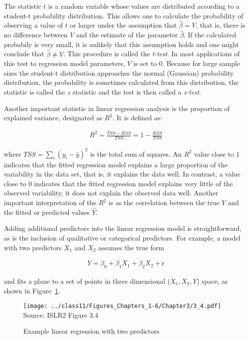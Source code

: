 The statistic $t$ is a random variable whose values are distributed according to a student-t probability distribution. This allows one to calculate the probability of observing a value of $t$ or larger under the assumption that $\hat{\beta} = V$, that is, there is no difference between $V$ and the estimate of the parameter $\hat{\beta}$. If the calculated probabily is very small, it is unlikely that this assumption holds and one might conclude that $\hat{\beta} \neq V$. This procedure is called the \emph{t-test}. In most applications of this test to regression model parameters, $V$ is set to $0$. Because for large sample sizes the student-t distribution approaches the normal (Gaussian) probability distribution, the probability is sometimes calculated from this distribution, the statistic is called the $z$ statistic and the test is then called a \emph{z-test}.

Another important statistic in linear regression analysis is the proportion of explained variance, designated as $R^2$. It is defined as:

\begin{align*}
R^2 = \frac{TSS - RSS}{TSS} = 1 - \frac{RSS}{TSS}
\end{align*}

\noindent where $TSS = \sum_i(y_i - \bar{y})^2$ is the total sum of squares. An $R^2$ value close to $1$ indicates that the fitted regression model explains a large proportion of the variability in the data set, that is, it explains the data well. In contrast, a value close to $0$ indicates that the fitted regression model explains very little of the observed variability, it does not explain the observed data well. Another important interpretation of the $R^2$ is as the correlation between the true $Y$ and the fitted or predicted values $\hat{Y}$.

Adding additional predictors into the linear regression model is straightforward, as is the inclusion of qualitative or categorical predictors. For example, a model with two predictors $X_1$ and $X_2$ assumes the true form

\begin{align*}
Y = \beta_0 + \beta_1 X_1 + \beta_2 X_2 + \epsilon
\end{align*}

\noindent and fits a plane to a set of points in three dimensional ($X_1, X_2, Y$) space, as shown in Figure~\ref{fig:plane}. 

\begin{figure}
\centering
\texttt{[image: ../class11/Figures\_Chapters\_1-6/Chapter3/3\_4.pdf]}  \\

\scriptsize Source: ISLR2 Figure 3.4
\caption{Example linear regression with two predictors}
\label{fig:plane}
\end{figure}


